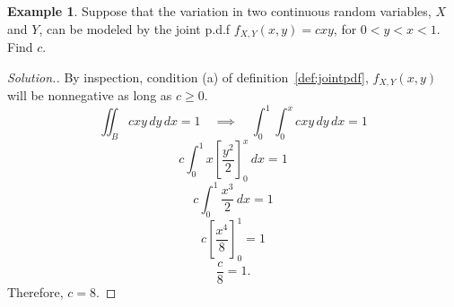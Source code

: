 \documentclass[12pt,a4paper]{report}
\theoremstyle{definition}
\newtheorem{example}[thm]{Example}
\theoremstyle{plain}
\theoremstyle{definition}
\begin{document}
\begin{example}
Suppose that the variation in two continuous random variables, $X$ and $Y$, can be modeled by the joint p.d.f $f_{X,Y}(x,y) = cxy$, for $0 < y < x < 1$. Find $c$.
\end{example}

\begin{proof}[\textit{Solution.}] 
\label{ex:cxy}By inspection, condition (a) of definition~\ref{def:jointpdf}, $f_{X,Y}(x,y)$ will be nonnegative as long as $c\geq 0$.
\[\iint_{B}cxy\, dy\, dx = 1\quad \implies\quad\int^1_0\int^x_0cxy\, dy \, dx = 1\]
\[c\int^1_0x\left[\frac{y^2}{2}\right]^x_0\, dx =  1\]
\[c\int^1_0\frac{x^3}{2}\, dx = 1\]
\[c\left[\frac{x^4}{8}\right]^1_0 = 1\]
\[\frac{c}{8} = 1.\]
Therefore, $c = 8$.
\end{proof}
\end{document}
